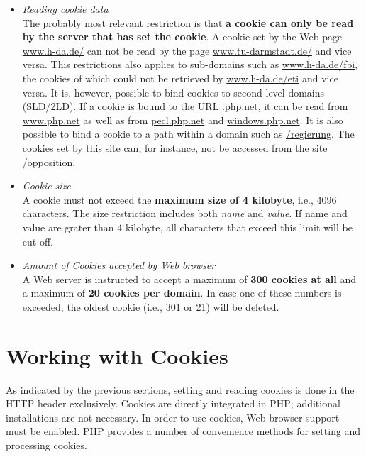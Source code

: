 \documentclass[a4paper, justified, notoc]{tufte-handout} %
\begin{document}
\begin{itemize}
	\item \emph{Reading cookie data} \\ The probably most relevant restriction is that \textbf{a cookie can only be read by the server that has set the cookie}. 
A cookie set by the Web page \url{www.h-da.de/} can not be read by the page \url{www.tu-darmstadt.de/} and vice versa. This restrictions also applies to sub-domains such as \url{www.h-da.de/fbi}, the cookies of which could not be retrieved by \url{www.h-da.de/eti} and vice versa. 
It is, however, possible to bind cookies to second-level domains (SLD/2LD).
If a cookie is bound to the URL \url{.php.net}, it can be read from \url{www.php.net} as well as from \url{pecl.php.net} and \url{windows.php.net}.
It is also possible to bind a cookie to a path within a domain such as \url{/regierung}. The cookies set by this site can, for instance, not be accessed from the site \url{/opposition}.

\item \emph{Cookie size} \\ A cookie must not exceed the \textbf{maximum size of 4 kilobyte}, i.e., 4096 characters. The size restriction includes both \emph{name} and \emph{value}. If name and value are grater than 4 kilobyte, all characters that exceed this limit will be cut off. 

\item \emph{Amount of Cookies accepted by Web browser} \\ A Web server is instructed to accept a maximum of \textbf{300 cookies at all} and a maximum of \textbf{20 cookies per domain}. In case one of these numbers is exceeded, the oldest cookie (i.e., 301 or 21) will be deleted.    
\end{itemize}



\section{Working with Cookies } %
\label{sec:working_with_cookies}
As indicated by the previous sections, setting and reading cookies is done in the HTTP header exclusively. 
Cookies are directly integrated in PHP; additional installations are not necessary. 
In order to use cookies, Web browser support must be enabled.
PHP provides a number of convenience methods for setting and processing cookies.
\end{document}
